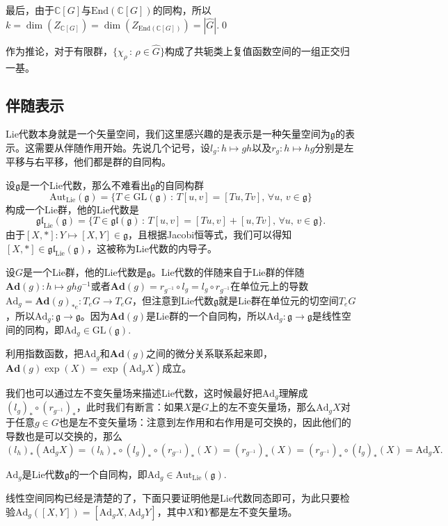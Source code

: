 \documentclass[9pt]{extarticle}
\newcommand{\cc}{\mathbb{C}}
\newcommand{\lag}{{\mathfrak{g}}}
\begin{document}
最后，由于$\cc [G]$与$\mathrm{End}(\cc [G])$的同构，所以$k=\dim (Z_{\cc [G]})=\dim (Z_{\mathrm{End}(\cc [G])})=|\hat{G}|$.\qed

\para 作为推论，对于有限群，$\{\chi_\rho\,:\, \rho\in \hat{G}\}$构成了共轭类上复值函数空间的一组正交归一基。

\subsection*{伴随表示}

Lie代数本身就是一个矢量空间，我们这里感兴趣的是表示是一种矢量空间为$\lag$的表示。这需要从伴随作用开始。先说几个记号，设$l_g:h\mapsto gh$以及$r_g:h\mapsto hg$分别是左平移与右平移，他们都是群的自同构。

\para 设$\lag$是一个Lie代数，那么不难看出$\lag$的自同构群
\[\mathrm{Aut}_{\mathrm{Lie}}(\lag)=\{T\in \mathrm{GL}(\lag)\,:\,T[u,v]=[Tu,Tv],\,\forall u,\,v\in\lag\}\]
构成一个Lie群，他的Lie代数是
\[\mathfrak{gl}_{\mathrm{Lie}}(\lag)=\{T\in \mathfrak{gl}(\lag)\,:\,T[u,v]=[Tu,v]+[u,Tv],\,\forall u,\,v\in\lag\}.\]
由于$[X,*]:Y\mapsto [X,Y]\in \lag$，且根据Jacobi恒等式，我们可以得知$[X,*]\in \mathfrak{gl}_{\mathrm{Lie}}(\lag)$，这被称为Lie代数的内导子。

\para 设$G$是一个Lie群，他的Lie代数是$\lag$。Lie代数的伴随来自于Lie群的伴随$\mathbf{Ad}(g):h\mapsto ghg^{-1}$或者$\mathbf{Ad}(g)=r_{g^{-1}}\circ l_g=l_g\circ r_{g^{-1}}$在单位元上的导数$\mathrm{Ad}_g=\mathbf{Ad}(g)_{*e}:T_eG\to T_eG$，但注意到Lie代数$\lag$就是Lie群在单位元的切空间$T_eG$，所以$\mathrm{Ad}_g:\lag\to \lag$。因为$\mathbf{Ad}(g)$是Lie群的一个自同构，所以$\mathrm{Ad}_g:\lag\to\lag$是线性空间的同构，即$\mathrm{Ad}_g\in \mathrm{GL}(\lag)$.

利用指数函数，把$\mathrm{Ad}_g$和$\mathbf{Ad}(g)$之间的微分关系联系起来即，$\mathbf{Ad}(g)\exp(X)=\exp(\mathrm{Ad}_gX)$成立。

\para 我们也可以通过左不变矢量场来描述Lie代数，这时候最好把$\mathrm{Ad}_g$理解成$(l_g)_*\circ (r_{g^{-1}})_*$，此时我们有断言：如果$X$是$G$上的左不变矢量场，那么$\mathrm{Ad}_gX$对于任意$g\in G$也是左不变矢量场：注意到左作用和右作用是可交换的，因此他们的导数也是可以交换的，那么
\[
	(l_h)_*(\mathrm{Ad}_gX)=(l_h)_*\circ (l_g)_*\circ (r_{g^{-1}})_*(X)=(r_{g^{-1}})_*(X)=(r_{g^{-1}})_*\circ (l_g)_*(X)=\mathrm{Ad}_gX.
\]

\para $\mathrm{Ad}_g$是Lie代数$\lag$的一个自同构，即$\mathrm{Ad}_g\in \mathrm{Aut}_{\mathrm{Lie}}(\lag)$.

线性空间同构已经是清楚的了，下面只要证明他是Lie代数同态即可，为此只要检验$\mathrm{Ad}_g([X,Y])=[\mathrm{Ad}_gX,\mathrm{Ad}_gY]$，其中$X$和$Y$都是左不变矢量场。
\end{document}
